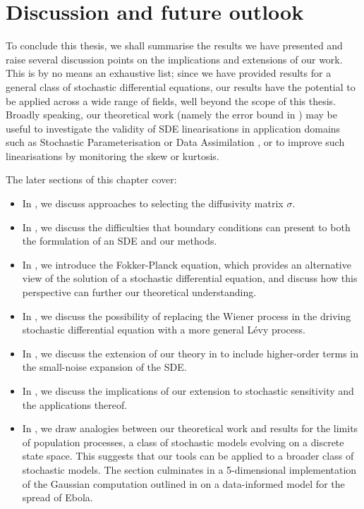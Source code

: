 \chapter{Discussion and future outlook}\label{ch:outlook}
To conclude this thesis, we shall summarise the results we have presented and raise several discussion points on the implications and extensions of our work.
This is by no means an exhaustive list; since we have provided results for a general class of stochastic differential equations, our results have the potential to be applied across a wide range of fields, well beyond the scope of this thesis.
Broadly speaking, our theoretical work (namely the error bound in ) may be useful to investigate the validity of SDE linearisations in application domains such as Stochastic Parameterisation \citep{BernerEtAl_2017_StochasticParameterizationNew,Palmer_2019_StochasticWeatherClimate,LeutbecherEtAl_2017_StochasticRepresentationsModel} or Data Assimilation \citep{BudhirajaEtAl_2019_AssimilatingDataModels,ReichCotter_2015_ProbabilisticForecastingBayesian,LawEtAl_2015_DataAssimilationMathematical}, or to improve such linearisations by monitoring the skew or kurtosis.

The later sections of this chapter cover:
\begin{itemize}
	\item In , we discuss approaches to selecting the diffusivity matrix \(\sigma\).
	\item In , we discuss the difficulties that boundary conditions can present to both the formulation of an SDE and our methods.
	\item In , we introduce the Fokker-Planck equation, which provides an alternative view of the solution of a stochastic differential equation, and discuss how this perspective can further our theoretical understanding.
	\item In , we discuss the possibility of replacing the Wiener process in the driving stochastic differential equation with a more general L\'evy process.
	\item In , we discuss the extension of our theory in  to include higher-order terms in the small-noise expansion of the SDE.
	\item In , we discuss the implications of our extension to stochastic sensitivity and the applications thereof.
	\item In , we draw analogies between our theoretical work and results for the limits of population processes, a class of stochastic models evolving on a discrete state space.
	      This suggests that our tools can be applied to a broader class of stochastic models.
	      The section culminates in a 5-dimensional implementation of the Gaussian computation outlined in  on a data-informed model for the spread of Ebola.
\end{itemize}

